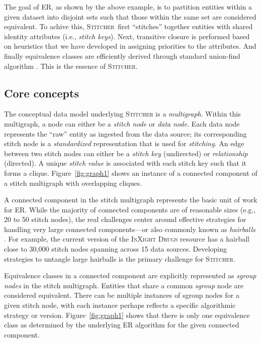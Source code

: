 \documentclass{bmcart}
\newcommand\st{\textsc{Stitcher}}
\newcommand\ix{\textsc{InXight Drugs}}
\begin{document}
The goal of ER, as shown by the above example, is to partition
entities within a given dataset into disjoint sets such that those
within the same set are considered equivalent. To achive this,
\st\ first ``stitches'' together entities with shared identity
attributes (i.e., \emph{stitch keys}). Next, transitive closure is
performed based on heuristics that we have developed in assigning
priorities to the attributes. And finally equivalence classes are
efficiently derived through standard  union-find algorithm
\cite{Cormen2001}. This is the essence of \st.

\subsection*{Core concepts}
The conceptual data model underlying \st{} is a \emph{multigraph}.
Within this multigraph, a node can either be a \emph{stitch node}
or \emph{data node}. Each data node represents the ``raw'' entity as
ingested from the data source; its corresponding stitch node is
a \emph{standardized} representation that is used
for \emph{stitching}. An edge between two stitch nodes can either be
a \emph{stitch key} (undirected) or \emph{relationship} (directed). A
unique \emph{stitch value} is associated with each stitch key such
that it forms a clique. Figure~\ref{fig:graph1} shows an instance of a
connected component of a stitch multigraph with overlapping cliques. 

A connected component in the stitch multigraph represents the basic
unit of work for ER. While the majority of connected
components are of reasonable sizes (e.g., 20 to 50 stitch nodes), the
real challenges center around effective strategies for handling very
large connected components---or also commonly known
as \emph{hairballs} \cite{Croset2015}. For example, the current
version of the \ix{} resource has a hairball close to 30,000 stitch
nodes spanning across 15 data sources. Developing strategies to
untangle large hairballs is the primary challenge for \st.

Equivalence classes in a connected component are explicitly
represented as \emph{sgroup nodes} in the stitch multigraph. Entities
that share a common \emph{sgroup} node are considered equivalent.
There can be multiple instances of sgroup nodes for a given stitch
node, with each instance perhaps reflects a specific algorithmic 
strategy or version. Figure~\ref{fig:graph1} shows that there is only
one equivalence class as determined by the underlying ER algorithm for
the given connected component. 
\end{document}
